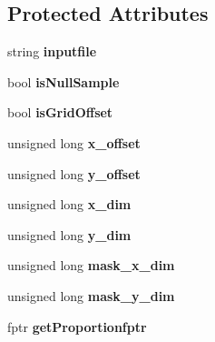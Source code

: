 \subsection*{Protected Attributes}
\begin{DoxyCompactItemize}
\item 
string {\bfseries inputfile}\hypertarget{class_data_mask_acde16cc845a6102a8b2ee0aa9b8917cb}{}\label{class_data_mask_acde16cc845a6102a8b2ee0aa9b8917cb}

\item 
bool {\bfseries is\+Null\+Sample}\hypertarget{class_data_mask_a32ba5989de78dd5a08a3b805c2d62d05}{}\label{class_data_mask_a32ba5989de78dd5a08a3b805c2d62d05}

\item 
bool {\bfseries is\+Grid\+Offset}\hypertarget{class_data_mask_a8a5d2e1724e76f785987fcb324b7ac75}{}\label{class_data_mask_a8a5d2e1724e76f785987fcb324b7ac75}

\item 
unsigned long {\bfseries x\+\_\+offset}\hypertarget{class_data_mask_a70178c907b2dc072b62f4bfb8f690823}{}\label{class_data_mask_a70178c907b2dc072b62f4bfb8f690823}

\item 
unsigned long {\bfseries y\+\_\+offset}\hypertarget{class_data_mask_ab4508058d8563d90bfc606a648cedb2f}{}\label{class_data_mask_ab4508058d8563d90bfc606a648cedb2f}

\item 
unsigned long {\bfseries x\+\_\+dim}\hypertarget{class_data_mask_aba77e907211dea06a4a52ad3036716b0}{}\label{class_data_mask_aba77e907211dea06a4a52ad3036716b0}

\item 
unsigned long {\bfseries y\+\_\+dim}\hypertarget{class_data_mask_aa2c689edd7b8bd84bb60e836aac4e378}{}\label{class_data_mask_aa2c689edd7b8bd84bb60e836aac4e378}

\item 
unsigned long {\bfseries mask\+\_\+x\+\_\+dim}\hypertarget{class_data_mask_ab971fd5a14a17e850cd92c79c3a1543e}{}\label{class_data_mask_ab971fd5a14a17e850cd92c79c3a1543e}

\item 
unsigned long {\bfseries mask\+\_\+y\+\_\+dim}\hypertarget{class_data_mask_a5ab1bf33e9b9fac964c8c2576fc5edca}{}\label{class_data_mask_a5ab1bf33e9b9fac964c8c2576fc5edca}

\item 
fptr {\bfseries get\+Proportionfptr}\hypertarget{class_data_mask_a67c92c63f3397de5312c573281515c1c}{}\label{class_data_mask_a67c92c63f3397de5312c573281515c1c}

\end{DoxyCompactItemize}



